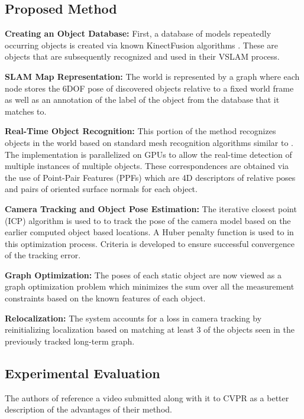 \documentclass[10pt,twocolumn,letterpaper]{article}
\begin{document}
\subsection{Proposed Method}
\textbf{Creating an Object Database:} First, a database of models repeatedly occurring objects is created via known KinectFusion algorithms \cite{kf11}. These are objects that are subsequently recognized and used in their VSLAM process. 

\textbf{SLAM Map Representation:} The world is represented by a graph where each node stores the 6DOF 
pose of discovered objects relative to a fixed world frame as well as an annotation of the label of the object from the database that it matches to.

\textbf{Real-Time Object Recognition:} This portion of the method recognizes objects in the world based on standard mesh recognition algorithms similar to \cite{drost6}. The implementation is parallelized on GPUs to allow the real-time detection of multiple instances of multiple objects. These correspondences are obtained via the use of Point-Pair Features (PPFs) which are 4D descriptors of relative poses and pairs of oriented surface normals for each object. 

\textbf{Camera Tracking and Object Pose Estimation:} The iterative closest point (ICP) algorithm \cite{icp15} is used to to track the pose of the camera model based on the earlier computed object based locations. A Huber penalty function is used to in this optimization process. Criteria is developed to ensure successful convergence of the tracking error.

\textbf{Graph Optimization:} The poses of each static object are now viewed as a graph optimization problem which minimizes the sum over all the measurement constraints based on the known features of each object.

\textbf{Relocalization:} The system accounts for a loss in camera tracking by reinitializing localization based on matching at least 3 of the objects seen in the previously tracked long-term graph. 

\subsection{Experimental Evaluation}
The authors of \cite{Salas-Moreno_2013_CVPR} reference a video submitted along with it to CVPR as a better description of the advantages of their method. 
\end{document}
